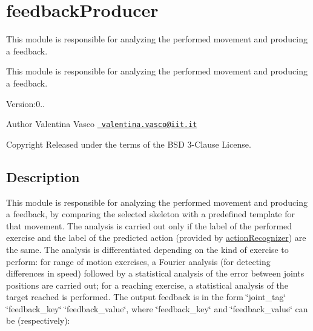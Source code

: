 \section{feedback\+Producer}
\label{group__feedbackProducer}


This module is responsible for analyzing the performed movement and producing a feedback.  


This module is responsible for analyzing the performed movement and producing a feedback. 

Version\+:0.. \begin{DoxyAuthor}{Author}
Valentina Vasco \href{mailto:valentina.vasco@iit.it}{\texttt{ valentina.\+vasco@iit.\+it}} ~\newline
 
\end{DoxyAuthor}
\begin{DoxyCopyright}{Copyright}
Released under the terms of the B\+SD 3-\/Clause License. 
\end{DoxyCopyright}
\hypertarget{group__skeletonViewer_intro_sec}{}\subsection{Description}\label{group__skeletonViewer_intro_sec}
This module is responsible for analyzing the performed movement and producing a feedback, by comparing the selected skeleton with a predefined template for that movement. The analysis is carried out only if the label of the performed exercise and the label of the predicted action (provided by \mbox{\hyperlink{group__actionRecognizer}{action\+Recognizer}}) are the same. The analysis is differentiated depending on the kind of exercise to perform\+: for range of motion exercises, a Fourier analysis (for detecting differences in speed) followed by a statistical analysis of the error between joints\textquotesingle{} positions are carried out; for a reaching exercise, a statistical analysis of the target reached is performed. The output feedback is in the form \char`\"{}joint\+\_\+tag\char`\"{} \char`\"{}feedback\+\_\+key\char`\"{} \char`\"{}feedback\+\_\+value\char`\"{}, where \char`\"{}feedback\+\_\+key\char`\"{} and \char`\"{}feedback\+\_\+value\char`\"{} can be (respectively)\+:
